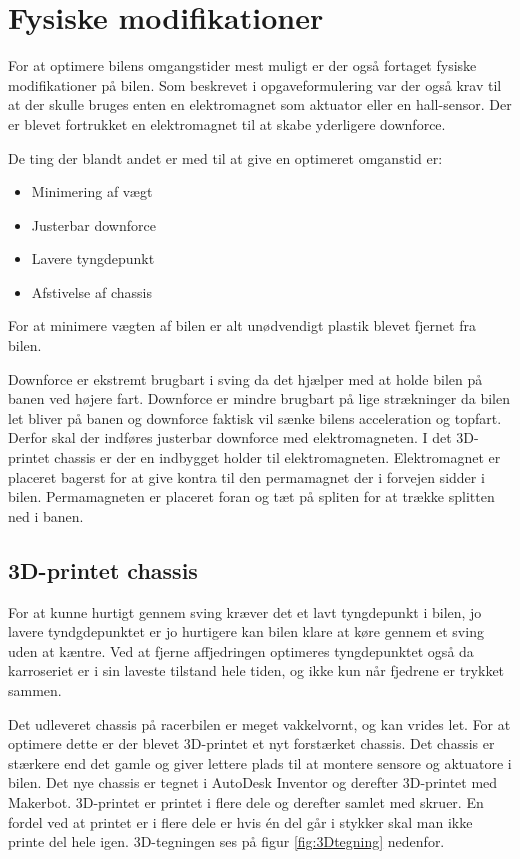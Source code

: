 \newpage
\section{Fysiske modifikationer}
For at optimere bilens omgangstider mest muligt er der også fortaget fysiske modifikationer på bilen. Som beskrevet i opgaveformulering var der også krav til at der skulle bruges enten en elektromagnet som aktuator eller en hall-sensor. Der er blevet fortrukket en elektromagnet til at skabe yderligere downforce.

De ting der blandt andet er med til at give en optimeret omganstid er:
\begin{itemize}
\item Minimering af vægt
\item Justerbar downforce
\item Lavere tyngdepunkt
\item Afstivelse af chassis
\end{itemize}
For at minimere vægten af bilen er alt unødvendigt plastik blevet fjernet fra bilen.

Downforce er ekstremt brugbart i sving da det hjælper med at holde bilen på banen ved højere fart. Downforce er mindre brugbart på lige strækninger da bilen let bliver på banen og downforce faktisk vil sænke bilens acceleration og topfart. Derfor skal der indføres justerbar downforce med elektromagneten. I det 3D-printet chassis er der en indbygget holder til elektromagneten. Elektromagnet er placeret bagerst for at give kontra til den permamagnet der i forvejen sidder i bilen. Permamagneten er placeret foran og tæt på spliten for at trække splitten ned i banen.

\subsection{3D-printet chassis}

For at kunne hurtigt gennem sving kræver det et lavt tyngdepunkt i bilen, jo lavere tyndgdepunktet er jo hurtigere kan bilen klare at køre gennem et sving uden at kæntre. Ved at fjerne affjedringen optimeres tyngdepunktet også da karroseriet er i sin laveste tilstand hele tiden, og ikke kun når fjedrene er trykket sammen.

Det udleveret chassis på racerbilen er meget vakkelvornt, og kan vrides let. For at optimere dette er der blevet 3D-printet et nyt forstærket chassis. Det chassis er stærkere end det gamle og giver lettere plads til at montere sensore og aktuatore i bilen. Det nye chassis er tegnet i AutoDesk Inventor og derefter 3D-printet med Makerbot. 3D-printet er printet i flere dele og derefter samlet med skruer. En fordel ved at printet er i flere dele er hvis én del går i stykker skal man ikke printe del hele igen. 3D-tegningen ses på figur \ref{fig:3Dtegning} nedenfor.

